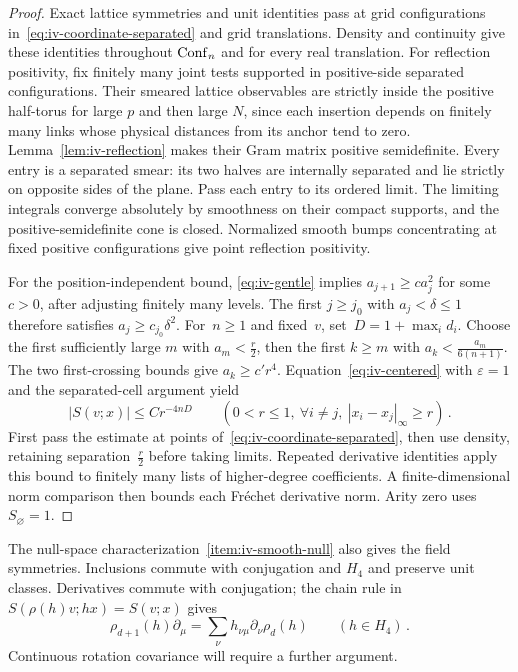 \begin{proof}
Exact lattice symmetries and unit identities pass at grid configurations in~\eqref{eq:iv-coordinate-separated} and grid translations.
Density and continuity give these identities throughout $\operatorname{Conf}_{n}$ and for every real translation.
For reflection positivity, fix finitely many joint tests supported in positive-side separated configurations.
Their smeared lattice observables are strictly inside the positive half-torus for large $p$ and then large $N$, since each insertion depends on finitely many links whose physical distances from its anchor tend to zero.
Lemma~\ref{lem:iv-reflection} makes their Gram matrix positive semidefinite.
Every entry is a separated smear: its two halves are internally separated and lie strictly on opposite sides of the plane.
Pass each entry to its ordered limit.
The limiting integrals converge absolutely by smoothness on their compact supports, and the positive-semidefinite cone is closed.
Normalized smooth bumps concentrating at fixed positive configurations give point reflection positivity.

For the position-independent bound, \eqref{eq:iv-gentle} implies $a_{j+1}\ge ca_j^2$ for some $c>0$, after adjusting finitely many levels.
The first $j\ge j_0$ with $a_j<\delta\le1$ therefore satisfies $a_j\ge c_{j_0}\delta^2$.
For~$n\ge1$ and fixed~$v$, set~$D=1+\max_i d_i$.
Choose the first sufficiently large $m$ with $a_m<\frac{r}{2}$, then the first $k\ge m$ with $a_k<\frac{a_m}{6(n+1)}$.
The two first-crossing bounds give $a_k\ge c' r^4$.
Equation~\eqref{eq:iv-centered} with $\varepsilon=1$ and the separated-cell argument yield
\begin{equation*}
|S(v;x)|\le Cr^{-4nD}\qquad
(0<r\le1,\ \forall i\ne j,\ |x_i-x_j|_\infty\ge r)\,.
\end{equation*}
First pass the estimate at points of~\eqref{eq:iv-coordinate-separated}, then use density, retaining separation~$\frac{r}{2}$ before taking limits.
Repeated derivative identities apply this bound to finitely many lists of higher-degree coefficients.
A finite-dimensional norm comparison then bounds each Fr\'echet derivative norm.
Arity zero uses $S_{\varnothing}=1$.
\end{proof}

The null-space characterization~\ref{item:iv-smooth-null} also gives the field symmetries.
Inclusions commute with conjugation and $H_4$ and preserve unit classes.
Derivatives commute with conjugation; the chain rule in $S(\rho(h)v;hx)=S(v;x)$ gives
\begin{equation*}
\rho_{d+1}(h)\partial_\mu=\sum_\nu h_{\nu\mu}\partial_\nu\rho_d(h)\qquad(h\in H_4)\,.
\end{equation*}
Continuous rotation covariance will require a further argument.

